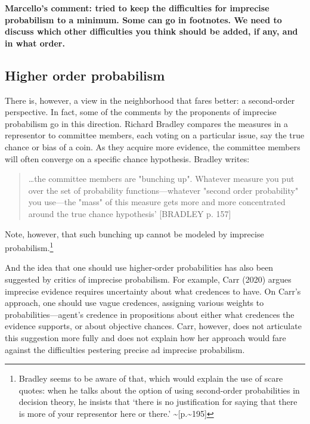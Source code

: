 \documentclass[
  10pt,
  dvipsnames,enabledeprecatedfontcommands]{scrartcl}
\begin{document}
\textbf{Marcello's comment: tried to keep the difficulties for imprecise probabilism to a minimum. Some can go in footnotes. We need to discuss which other difficulties you think should be added, if any, and in what order.}

\hypertarget{higher-order-probabilism}{%
\subsection{Higher order probabilism}\label{higher-order-probabilism}}

There is, however, a view in the neighborhood that fares better: a
second-order perspective.
 In fact, some of the
comments by the proponents of imprecise probabilism go in this
direction. Richard Bradley compares the measures in a representor to
committee members, each voting on a particular issue, say the true
chance or bias of a coin. As they acquire more evidence, the committee
members will often converge on a specific chance hypothesis. Bradley
writes:

\begin{quote}
\dots the committee members are "bunching up". Whatever measure you put over the set of probability functions---whatever "second order probability" you use---the "mass" of this measure gets more and more concentrated around the true chance hypothesis' [BRADLEY p. 157] 
\end{quote}

\noindent Note, however, that such bunching up cannot be modeled by
imprecise probabilism.\footnote{Bradley seems to be aware of that, which
  would explain the use of scare quotes: when he talks about the option
  of using second-order probabilities in decision theory, he insists
  that `there is no justification for saying that there is more of your
  representor here or there.' \textasciitilde{[}p.\textasciitilde195{]}}

And the idea that one should use higher-order probabilities has also
been suggested by critics of imprecise probabilism. For example, Carr
(2020) argues imprecise evidence requires uncertainty about what
credences to have. On Carr's approach, one should use vague credences,
assigning various weights to probabilities---agent's credence in
propositions about either what credences the evidence supports, or about
objective chances. Carr, however, does not articulate this suggestion
more fully and does not explain how her approach would fare against the
difficulties pestering precise ad imprecise probabilism.
\end{document}
